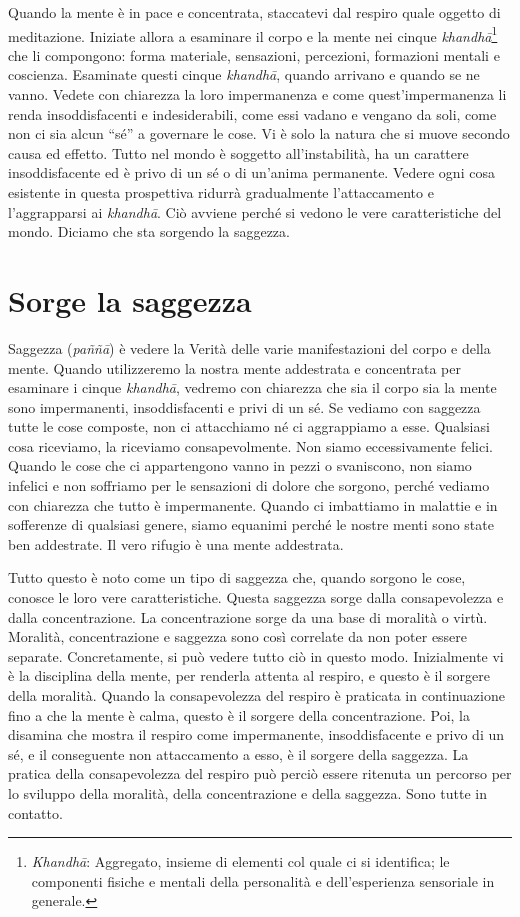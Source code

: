 Quando la mente è in pace e concentrata, staccatevi dal respiro quale
oggetto di meditazione. Iniziate allora a esaminare il corpo e la mente
nei cinque \emph{khandhā}\footnote{\emph{Khandhā}: Aggregato, insieme di
  elementi col quale ci si identifica; le componenti fisiche e mentali
  della personalità e dell'esperienza sensoriale in generale.} che li
compongono: forma materiale, sensazioni, percezioni, formazioni mentali
e coscienza. Esaminate questi cinque \emph{khandhā}, quando arrivano e
quando se ne vanno. Vedete con chiarezza la loro impermanenza e come
quest'impermanenza li renda insoddisfacenti e indesiderabili, come essi
vadano e vengano da soli, come non ci sia alcun ``sé'' a governare le
cose. Vi è solo la natura che si muove secondo causa ed effetto. Tutto
nel mondo è soggetto all'instabilità, ha un carattere insoddisfacente ed
è privo di un sé o di un'anima permanente. Vedere ogni cosa esistente in
questa prospettiva ridurrà gradualmente l'attaccamento e l'aggrapparsi
ai \emph{khandhā}. Ciò avviene perché si vedono le vere caratteristiche
del mondo. Diciamo che sta sorgendo la saggezza.

\section{Sorge la saggezza}

Saggezza (\emph{paññā}) è vedere la Verità delle varie manifestazioni
del corpo e della mente. Quando utilizzeremo la nostra mente addestrata
e concentrata per esaminare i cinque \emph{khandhā}, vedremo con
chiarezza che sia il corpo sia la mente sono impermanenti,
insoddisfacenti e privi di un sé. Se vediamo con saggezza tutte le cose
composte, non ci attacchiamo né ci aggrappiamo a esse. Qualsiasi cosa
riceviamo, la riceviamo consapevolmente. Non siamo eccessivamente
felici. Quando le cose che ci appartengono vanno in pezzi o svaniscono,
non siamo infelici e non soffriamo per le sensazioni di dolore che
sorgono, perché vediamo con chiarezza che tutto è impermanente. Quando
ci imbattiamo in malattie e in sofferenze di qualsiasi genere, siamo
equanimi perché le nostre menti sono state ben addestrate. Il vero
rifugio è una mente addestrata.

Tutto questo è noto come un tipo di saggezza che, quando sorgono le
cose, conosce le loro vere caratteristiche. Questa saggezza sorge dalla
consapevolezza e dalla concentrazione. La concentrazione sorge da una
base di moralità o virtù. Moralità, concentrazione e saggezza sono così
correlate da non poter essere separate. Concretamente, si può vedere
tutto ciò in questo modo. Inizialmente vi è la disciplina della mente,
per renderla attenta al respiro, e questo è il sorgere della moralità.
Quando la consapevolezza del respiro è praticata in continuazione fino a
che la mente è calma, questo è il sorgere della concentrazione. Poi, la
disamina che mostra il respiro come impermanente, insoddisfacente e
privo di un sé, e il conseguente non attaccamento a esso, è il sorgere
della saggezza. La pratica della consapevolezza del respiro può perciò
essere ritenuta un percorso per lo sviluppo della moralità, della
concentrazione e della saggezza. Sono tutte in contatto.

